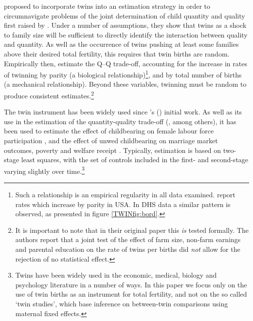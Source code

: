 \citet{RosenzweigWolpin1980} proposed to incorporate twins into an estimation
strategy in order to circumnavigate problems of the joint determination of child 
quantity and quality first raised by \citet{Becker1960,BeckerLewis1973,
Willis1973,DeTray1973,BeckerTomes1976}.  Under a number of assumptions, they show 
that twins as a shock to family size will be sufficient to directly identify the 
interaction between quality and quantity.  As well as the occurrence of twins 
pushing at least some families above their desired total fertility, this requires 
that twin births are random.  Empirically then, \citet{RosenzweigWolpin1980} 
estimate the Q--Q trade-off, accounting for the increase in rates of twinning by 
parity (a biological relationship)\footnote{Such a relationship is an empirical 
regularity in all data examined. \citet{RosenzweigWolpin1980} report rates which 
increase by parity in USA.  In DHS data a similar pattern is observed, as 
presented in figure \ref{TWINfig:bord}.}, and by total number of births (a 
mechanical relationship).  Beyond these variables, twinning must be random to
produce consistent estimates.\footnote{It is important to note that in their
original paper this \emph{is} tested formally.  The authors report that a joint
test of the effect of farm size, non-farm earnings and parental education on the
rate of twins per births did \emph{not} allow for the rejection of no 
statistical effect.}

The twin instrument has been widely used since \citeauthor{RosenzweigWolpin1980}'s
(\citeyear{RosenzweigWolpin1980}) initial work. As well as its use in the 
estimation of the quantity-quality trade-off (\citet{Blacketal2005,Caceres2006,
Lietal2008,Angristetal2010}, among others), it has been used to 
estimate the effect of childbearing on female labour force participation 
\citep{RosenzweigWolpin1980b,Jacobsenetal1999,AngristEvans1998}, and the effect 
of unwed childbearing on marriage market outcomes, poverty and welfare receipt 
\citep{BronarsGrogger1994}.  Typically, estimation is based on two-stage least
squares, with the set of controls included in the first- and second-stage 
varying slightly over time.\footnote{Twins have been widely used in the economic, 
medical, biology and psychology literature in a number of ways.  In this paper 
we focus only on the use of twin births as an instrument for total fertility, 
and not on the so called `twin studies', which base inference on between-twin 
comparisons using maternal fixed effects.}

